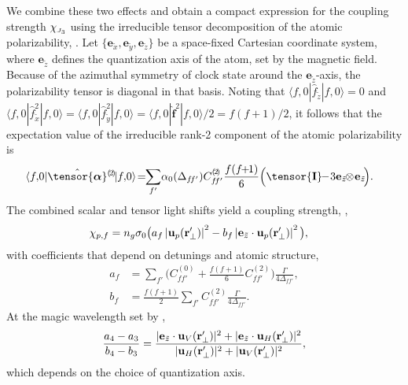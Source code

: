 \documentclass[aps,pra,twocolumn]{revtex4-1} %
\newcommand{\unittens}{\tensor{\mathbf{I}}}
\newcommand{\poltens}{\hat{\tensor{\boldsymbol{\alpha}}}}
\newcommand{\charpol}{\alpha_0(\Delta_{f\!f'})}
\newcommand{\qaxis}{\mathbf{e}_{\tilde{z}}}
\newcommand{\chieff}{\chi_{\raisebox{-.1pt}{\tiny $J_3$}}}
\begin{document}
We combine these two effects and obtain a compact expression for the coupling strength $\chieff$ using the irreducible tensor decomposition of the atomic polarizability, .  
Let $\{\mathbf{e}_{\tilde{x}},\mathbf{e}_{\tilde{y}}, \mathbf{e}_{\tilde{z}}\}$ be a space-fixed Cartesian coordinate system, where $\mathbf{e}_{\tilde{z}}$ defines the quantization axis of the atom, set by the magnetic field.  Because of the azimuthal symmetry of clock state around the $\qaxis$-axis, the polarizability tensor is diagonal in that basis.  
Noting that $\langle f,0 | \hat{f}_{\tilde{z}}| f,0 \rangle =0$ and $\langle f,0 | \hat{f}_{\tilde{x}}^2| f,0 \rangle = \langle f,0 | \hat{f}_{\tilde{y}}^2| f,0 \rangle = \langle f,0 | \hat{\mathbf{f}}^2| f,0 \rangle /2 =f(f+1)/2$, it follows that the expectation value of the irreducible rank-2 component of the atomic polarizability is
	\begin{align} \label{Eq::CouplingAngleMagic}
		\!\!\!\!\!\langle f,\! 0 | \poltens \phantom{}^{(\!2\!)}\!| f,\!0 \rangle \!=\!\! \sum_{f'}\! \charpol C^{(\!2\!)}_{f\!f'} \frac{f(f\!\!+\!\!1)}{6} \Big( \unittens \!\!-\! 3\qaxis \!\!\otimes\! \qaxis\! \Big).
	\end{align}
The combined scalar and tensor light shifts yield a coupling strength, ,
	\begin{align}
		\chi_{p,f} &  = n_g \sigma_0 \big(  a_{f} \left|\mathbf{u}_p(\mathbf{r}'_\perp)\right|^2 - b_{f} \left|\mathbf{e}_{\tilde{z}} \cdot \mathbf{u}_p(\mathbf{r}'_\perp)\right|^2 \big), \label{Eq::ClockStateCoupling}
	\end{align}
with coefficients that depend on detunings and atomic structure,
	\begin{align}
		a_f &= \sum_{f'}  \Big(C^{(0)}_{ff'} + \frac{f(f+1)}{6} C^{(2)}_{ff'} \Big) \frac{\Gamma}{4 \Delta_{ff'}},\\
		b_f &= \frac{f(f+1)}{2}\sum_{f'} C^{(2)}_{ff'}  \frac{\Gamma}{4 \Delta_{ff'}}.
	\end{align}
At the magic wavelength set by ,
\begin{equation}
	\frac{a_4-a_3}{b_4-b_3} =  \frac{ |\mathbf{e}_{\tilde{z}} \cdot \mathbf{u}_V(\mathbf{r}'_\perp)|^2  + |\mathbf{e}_{\tilde{z}} \cdot \mathbf{u}_H(\mathbf{r}'_\perp) |^2 }{ |\mathbf{u}_H(\mathbf{r}'_\perp)|^2 + |\mathbf{u}_V(\mathbf{r}'_\perp)|^2 },
\end{equation}
which depends on the choice of quantization axis.
\end{document}
